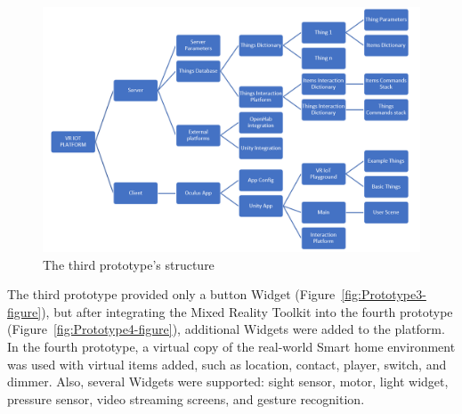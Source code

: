 \begin{figure}
  \centering
  \includegraphics[width=0.9\linewidth]{figures/Prototype3Structure.png}
  \caption{The third prototype's structure}
  \label{fig:Prototype3Structure-figure}
\end{figure}

The third prototype provided only a button Widget (Figure~\ref{fig:Prototype3-figure}), but after integrating the Mixed Reality Toolkit into the fourth prototype (Figure~\ref{fig:Prototype4-figure}), additional Widgets were added to the platform. In the fourth prototype, a virtual copy of the real-world Smart home environment was used with virtual items added, such as location, contact, player, switch, and dimmer. Also, several Widgets were supported: sight sensor, motor, light widget, pressure sensor, video streaming screens, and gesture recognition.


